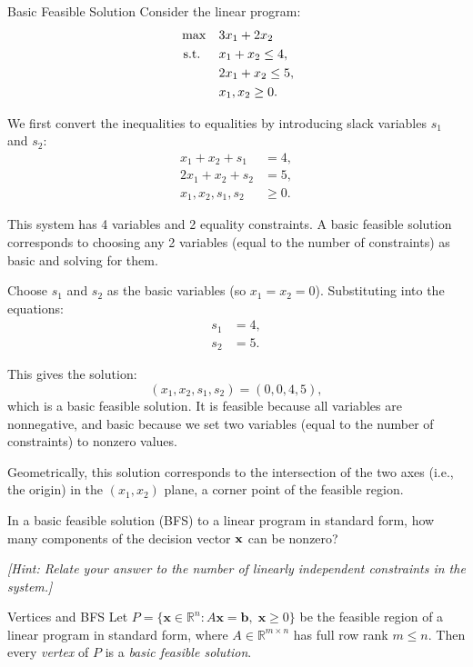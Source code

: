 \begin{example}{Basic Feasible Solution}\label{exa:bfs-2d-example}
Consider the linear program:
\[
\begin{aligned}
\max \quad & 3x_1 + 2x_2 \\
\text{ s.t. } \quad
& x_1 + x_2 \leq 4, \\
& 2x_1 + x_2 \leq 5, \\
& x_1, x_2 \geq 0.
\end{aligned}
\]

We first convert the inequalities to equalities by introducing slack variables \( s_1 \) and \( s_2 \):
\[
\begin{aligned}
x_1 + x_2 + s_1 &= 4, \\
2x_1 + x_2 + s_2 &= 5, \\
x_1, x_2, s_1, s_2 &\geq 0.
\end{aligned}
\]

This system has 4 variables and 2 equality constraints. A basic feasible solution corresponds to choosing any 2 variables (equal to the number of constraints) as basic and solving for them.

Choose \( s_1 \) and \( s_2 \) as the basic variables (so \( x_1 = x_2 = 0 \)). Substituting into the equations:
\[
\begin{aligned}
s_1 &= 4, \\
s_2 &= 5.
\end{aligned}
\]

This gives the solution:
\[
(x_1, x_2, s_1, s_2) = (0, 0, 4, 5),
\]
which is a basic feasible solution. It is feasible because all variables are nonnegative, and basic because we set two variables (equal to the number of constraints) to nonzero values.

\smallskip

Geometrically, this solution corresponds to the intersection of the two axes (i.e., the origin) in the \( (x_1, x_2) \) plane, a corner point of the feasible region.
\end{example}

\begin{learningcheckpoint}[label={lc:bfs-nonzero}]
In a basic feasible solution (BFS) to a linear program in standard form, how many components of the decision vector \(\mathbf{x}\) can be nonzero?

\emph{[Hint: Relate your answer to the number of linearly independent constraints in the system.]}
\end{learningcheckpoint}

\begin{proposition}{Vertices and BFS}
Let \( P = \{ \mathbf{x} \in \mathbb{R}^n : A\mathbf{x} = \mathbf{b},\; \mathbf{x} \geq 0 \} \) be the feasible region of a linear program in standard form, where \( A \in \mathbb{R}^{m \times n} \) has full row rank \( m \leq n \). Then every \emph{vertex} of \( P \) is a \emph{basic feasible solution}.
\end{proposition}

